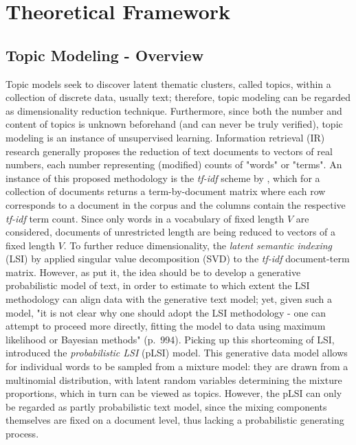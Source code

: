 \section{Theoretical Framework}

\subsection{Topic Modeling - Overview}

Topic models seek to discover latent thematic clusters, called topics, within a collection of discrete data, usually text; therefore, topic modeling can be regarded as dimensionality reduction technique. Furthermore, since both the number and content of topics is unknown beforehand (and can never be truly verified), topic modeling is an instance of unsupervised learning. Information retrieval (IR) research generally proposes the reduction of text documents to vectors of real numbers, each number representing (modified) counts of "words" or "terms". An instance of this proposed methodology is the \textit{tf-idf} scheme by \cite{salton1983information}, which for a collection of documents returns a term-by-document matrix where each row corresponds to a document in the corpus and the columns contain the respective \textit{tf-idf} term count. Since only words in a vocabulary of fixed length $V$ are considered, documents of unrestricted length are being reduced to vectors of a fixed length $V$. To further reduce dimensionality, the \textit{latent semantic indexing} (LSI) by \cite{deerwester1990indexing} applied singular value decomposition (SVD) to the \textit{tf-idf} document-term matrix. However, as \cite{blei2003latent} put it, the idea should be to develop a generative probabilistic model of text, in order to estimate to which extent the LSI methodology can align data with the generative text model; yet, given such a model, "it is not clear why one should adopt the LSI methodology - one can attempt to proceed more directly, fitting the model to data using maximum likelihood or Bayesian methods" (p.\ 994). Picking up this shortcoming of LSI, \cite{hofmann1999probabilistic} introduced the \textit{probabilistic LSI} (pLSI) model. This generative data model allows for individual words to be sampled from a mixture model: they are drawn from a multinomial distribution, with latent random variables determining the mixture proportions, which in turn can be viewed as topics. However, the pLSI can only be regarded as partly probabilistic text model, since the mixing components themselves are fixed on a document level, thus lacking a probabilistic generating process.

